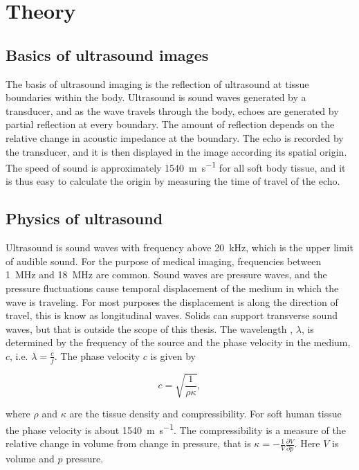 \section{Theory}
\subsection{Basics of ultrasound images}
The basis of ultrasound imaging is the reflection of ultrasound at tissue boundaries within the body. Ultrasound is sound waves generated by a transducer, and as the wave travels through the body, echoes are generated by partial reflection at every boundary. The amount of reflection depends on the relative change in acoustic impedance at the boundary. The echo is recorded by the transducer, and it is then displayed in the image according its spatial origin. The speed of sound is approximately \SI{1540}{\metre\per\second} for all soft body tissue, and it is thus easy to calculate the origin by measuring the time of travel of the echo. 

\subsection{Physics of ultrasound}
Ultrasound is sound waves with frequency above \SI{20}{\kilo\hertz}, which is the upper limit of audible sound. For the purpose of medical imaging, frequencies between \SI{1}{\mega\hertz} and \SI{18}{\mega\hertz} are common. Sound waves are pressure waves, and the pressure fluctuations cause temporal displacement of the medium in which the wave is traveling. For most purposes the displacement is along the direction of travel, this is know as longitudinal waves. Solids can support transverse sound waves, but that is outside the scope of this thesis.  The wavelength , $\lambda$, is determined by the frequency of the source and the phase velocity in the medium, $c$, i.e. $\lambda= \frac{c}{f}$. The phase velocity $c$ is given by

\begin{equation}
\label{phace velocity}
c = \sqrt{\frac{1}{\rho \kappa}},
\end{equation}

where $\rho$ and $\kappa$ are the tissue density and compressibility. For soft human tissue the phase velocity is about \SI{1540}{\metre\per\second}.%
The compressibility is a measure of the relative change in volume from change in pressure, that is $\kappa = -\frac{1}{V}\frac{\partial V}{\partial p}$. Here $V$ is volume and $p$ pressure. 

